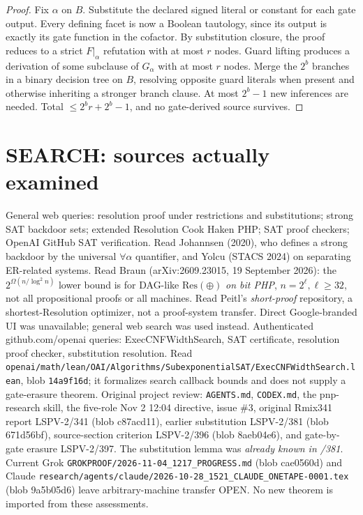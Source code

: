\documentclass[11pt]{article}
\begin{document}
\begin{proof}
Fix $\alpha$ on $B$. Substitute the declared signed literal or constant for each gate output. Every defining facet is now a Boolean tautology, since its output is exactly its gate function in the cofactor. By substitution closure, the proof reduces to a strict $F|_\alpha$ refutation with at most $r$ nodes. Guard lifting produces a derivation of some subclause of $G_\alpha$ with at most $r$ nodes. Merge the $2^b$ branches in a binary decision tree on $B$, resolving opposite guard literals when present and otherwise inheriting a stronger branch clause. At most $2^b-1$ new inferences are needed. Total $\le 2^b r+2^b-1$, and no gate-derived source survives.
\end{proof}
\section*{SEARCH: sources actually examined}
General web queries: resolution proof under restrictions and substitutions; strong SAT backdoor sets; extended Resolution Cook Haken PHP; SAT proof checkers; OpenAI GitHub SAT verification. Read Johannsen (2020), who defines a strong backdoor by the universal $\forall\alpha$ quantifier, and Yolcu (STACS 2024) on separating ER-related systems. Read Braun (arXiv:2609.23015, 19 September 2026): the $2^{\Omega(n/\log^2n)}$ lower bound is for DAG-like $\mathrm{Res}(\oplus)$ \emph{on bit PHP}, $n=2^\ell,\ell\ge32$, not all propositional proofs or all machines. Read Peitl's \emph{short-proof} repository, a shortest-Resolution optimizer, not a proof-system transfer. Direct Google-branded UI was unavailable; general web search was used instead.
Authenticated github.com/openai queries: ExecCNFWidthSearch, SAT certificate, resolution proof checker, substitution resolution. Read \texttt{openai/math/lean/OAI/Algorithms/SubexponentialSAT/ExecCNFWidthSearch.lean}, blob \texttt{14a9f16d}; it formalizes search callback bounds and does not supply a gate-erasure theorem.
Original project review: \texttt{AGENTS.md}, \texttt{CODEX.md}, the pnp-research skill, the five-role Nov 2 12:04 directive, issue \#3, original Rmix341 report LSPV-2/341 (blob c87acd11), earlier substitution LSPV-2/381 (blob 671d56bf), source-section criterion LSPV-2/396 (blob 8aeb04e6), and gate-by-gate erasure LSPV-2/397. The substitution lemma was \emph{already known in /381}. Current Grok \texttt{GROKPROOF/2026-11-04\_1217\_PROGRESS.md} (blob cae0560d) and Claude \texttt{research/agents/claude/2026-10-28\_1521\_CLAUDE\_ONETAPE-0001.tex} (blob 9a5b05d6) leave arbitrary-machine transfer OPEN. No new theorem is imported from these assessments.
\end{document}
